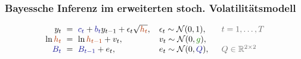 \documentclass[10pt]{beamer}
\theoremstyle{definition}
\newcommand{\R}{\mathbb{R}} %
\newcommand{\Normal}{\mathcal{N}} %
\newcommand{\stepOne}[1]{\textcolor{StepOneColor}{#1}}
\newcommand{\stepTwo}[1]{\textcolor{StepTwoColor}{#1}}
\newcommand{\stepThree}[1]{\textcolor{StepThreeColor}{#1}}
\newcommand{\typeInfo}[1]{\textcolor{TypeInfoColor}{#1}}
\begin{document}
\begin{frame}[t]
  \frametitle{Bayessche Inferenz im erweiterten stoch. Volatilitätsmodell}

  \begin{modelbox}
    \[
      \arraycolsep=3pt
      \begin{array}{rclll}
        y_t &=& \stepThree{c_t} + \stepThree{b_t} y_{t-1} + \epsilon_t \sqrt{\stepOne{h_t}}, & \enspace \epsilon_t \sim \Normal(0, 1), & \quad \typeInfo{t = 1, \ldots, T} \\
        \ln \stepOne{h_t} &=& \ln \stepOne{h_{t-1}} + v_t, & \enspace v_t \sim \Normal(0, \stepTwo{g}), \\
        \stepThree{B_t} &=& \stepThree{B_{t-1}} + e_t, & \enspace e_t \sim \Normal(0, \stepThree{Q}), & \quad \typeInfo{Q \in \R^{2 \times 2}}
      \end{array}
    \]
  \end{modelbox}


\end{frame}
\end{document}
